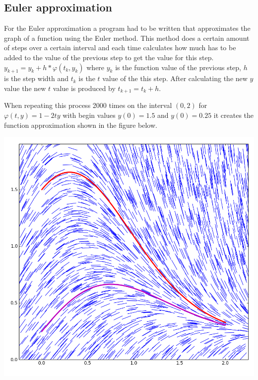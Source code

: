 \documentclass[a4paper,12px]{article}
\begin{document}
\subsection{Euler approximation}

For the Euler approximation a program had to be written that approximates the
graph of a function using the Euler method. This method does a certain amount of
steps over a certain interval and each time calculates how much has to be added
to the value of the previous step to get the value for this step.
$y_{k+1}=y_k+h*\varphi (t_k,y_k)$ where $y_k$ is the function value of the
previous step, $h$ is the step width and $t_k$ is the $t$ value of the  this
step. After calculating the new $y$ value the new $t$ value is produced by
$t_{k+1} = t_k + h$.

When repeating this process 2000 times on the interval $(0,2)$ for $\varphi(t,
y) = 1-2ty$ with begin values $y(0) = 1.5$ and $y(0) = 0.25$ it creates the
function approximation shown in the figure below.

\begin{center}
    \includegraphics[width=\textwidth]{euler1}
\end{center}
\end{document}
